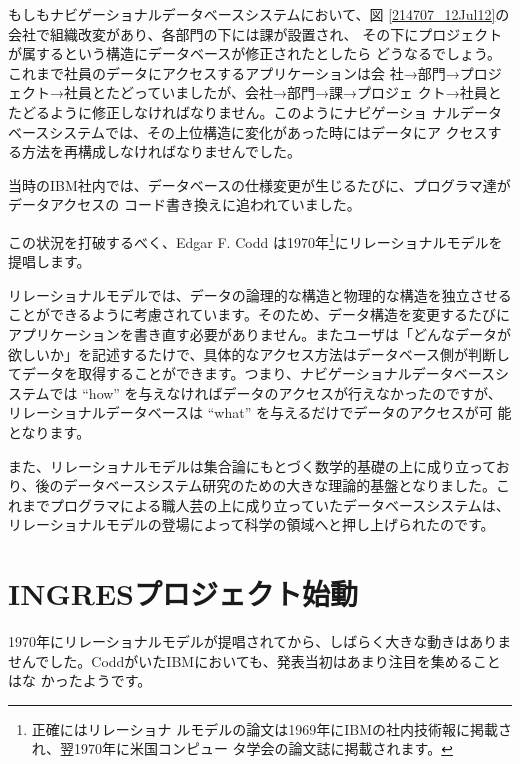 もしもナビゲーショナルデータベースシステムにおいて、図
\ref{214707_12Jul12}の会社で組織改変があり、各部門の下には課が設置され、
その下にプロジェクトが属するという構造にデータベースが修正されたとしたら
どうなるでしょう。これまで社員のデータにアクセスするアプリケーションは会
社→部門→プロジェクト→社員とたどっていましたが、会社→部門→課→プロジェ
クト→社員とたどるように修正しなければなりません。このようにナビゲーショ
ナルデータベースシステムでは、その上位構造に変化があった時にはデータにア
クセスする方法を再構成しなければなりませんでした。


当時のIBM社内では、データベースの仕様変更が生じるたびに、プログラマ達がデータアクセスの
コード書き換えに追われていました。


この状況を打破するべく、Edgar F. Codd は1970年\footnote{正確にはリレーショナ
ルモデルの論文は1969年にIBMの社内技術報に掲載され、翌1970年に米国コンピュー
タ学会の論文誌に掲載されます。}にリレーショナルモデルを提唱します。


リレーショナルモデルでは、データの論理的な構造と物理的な構造を独立させる
ことができるように考慮されています。そのため、データ構造を変更するたびに
アプリケーションを書き直す必要がありません。またユーザは「どんなデータが
欲しいか」を記述するたけで、具体的なアクセス方法はデータベース側が判断し
てデータを取得することができます。つまり、ナビゲーショナルデータベースシ
ステムでは ``how'' を与えなければデータのアクセスが行えなかったのですが、
リレーショナルデータベースは ``what'' を与えるだけでデータのアクセスが可
能となります。


また、リレーショナルモデルは集合論にもとづく数学的基礎の上に成り立ってお
り、後のデータベースシステム研究のための大きな理論的基盤となりました。こ
れまでプログラマによる職人芸の上に成り立っていたデータベースシステムは、
リレーショナルモデルの登場によって科学の領域へと押し上げられたのです。


\section{INGRESプロジェクト始動}


1970年にリレーショナルモデルが提唱されてから、しばらく大きな動きはありま
せんでした。CoddがいたIBMにおいても、発表当初はあまり注目を集めることはな
かったようです。

